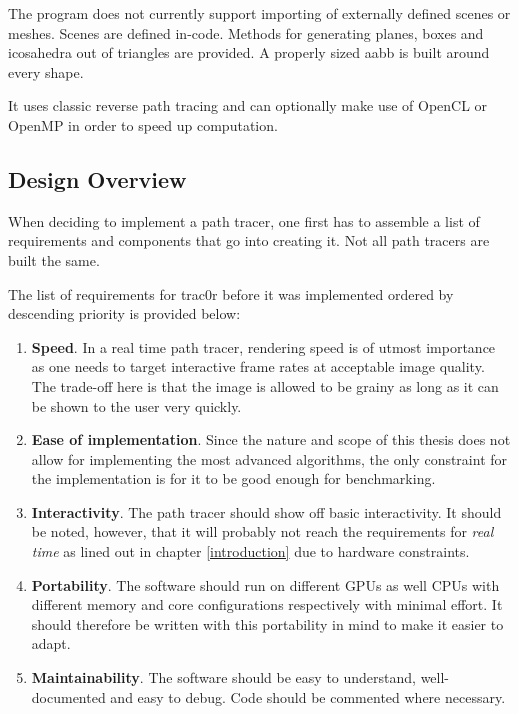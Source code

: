 \documentclass[
  twoside,
  11pt, a4paper,
  footinclude=true,
  headinclude=true,
  cleardoublepage=empty
]{scrreprt}
\begin{document}
The program does not currently support importing of externally defined scenes or meshes. Scenes are
defined in-code. Methods for generating planes, boxes and icosahedra out of triangles are
provided. A properly sized \ac{aabb} is built around every shape.

It uses classic reverse path tracing and can optionally make use of OpenCL or OpenMP in order to
speed up computation.

\subsection{Design Overview}
When deciding to implement a path tracer, one first has to assemble a list of requirements and
components that go into creating it. Not all path tracers are built the same.

The list of requirements for trac0r before it was implemented ordered by descending priority is
provided below:

\begin{enumerate}
    \item \textbf{Speed}. In a real time path tracer, rendering speed is of utmost importance as one needs
        to target interactive frame rates at acceptable image quality. The trade-off here is that
        the image is allowed to be grainy as long as it can be shown to the user very quickly.
    \item \textbf{Ease of implementation}. Since the nature and scope of this thesis does not allow for implementing
        the most advanced algorithms, the only constraint for the implementation is for it to be
        good enough for benchmarking.
    \item \textbf{Interactivity}. The path tracer should show off basic interactivity. It should be
        noted, however, that it will probably not reach the requirements for \emph{real time}
        as lined out in chapter \ref{introduction} due to hardware constraints.
    \item \textbf{Portability}. The software should run on different GPUs as well CPUs with different
        memory and core configurations respectively with minimal effort. It should therefore be
        written with this portability in mind to make it easier to adapt.
    \item \textbf{Maintainability}. The software should be easy to understand, well-documented and
        easy to debug. Code should be commented where necessary.
\end{enumerate}
\end{document}
